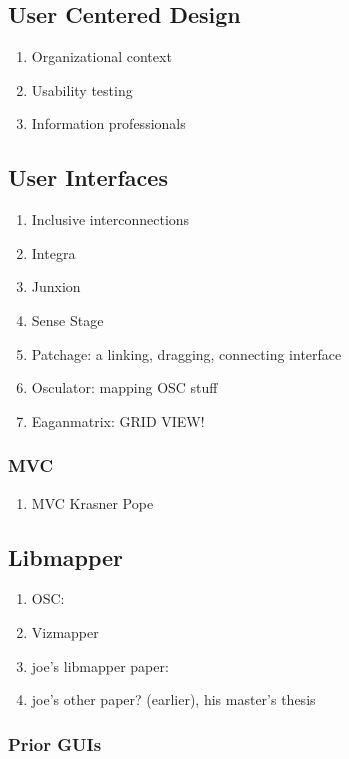 \subsection{User Centered Design}
	\begin{enumerate}
		\item Organizational context 
		\item Usability testing 
		\item Information professionals 
	\end{enumerate}

\subsection{User Interfaces}
	\begin{enumerate}
		\item Inclusive interconnections 
		\item Integra 
		\item Junxion 
		\item Sense Stage 
		\item Patchage: a linking, dragging, connecting interface 
		\item Osculator: mapping OSC stuff 
		\item Eaganmatrix: GRID VIEW! 
	\end{enumerate}
		\subsubsection{MVC}
			\begin{enumerate}
				\item MVC Krasner Pope 
			\end{enumerate}

\subsection{Libmapper}
	\begin{enumerate}
		\item OSC: 
		\item Vizmapper 
		\item joe's libmapper paper: 
		\item joe's other paper? (earlier), his master's thesis
	\end{enumerate}
	\subsubsection{Prior GUIs}
	\label{sec:priorGUIs}

